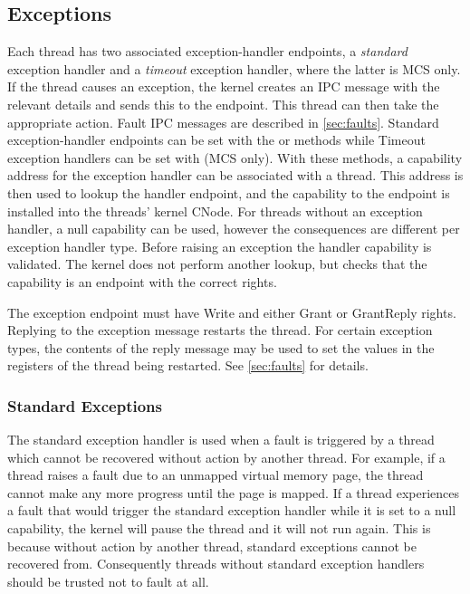 \subsection{Exceptions}
\label{sec:exceptions}

Each thread has two associated exception-handler endpoints, a \emph{standard}
exception handler and a \emph{timeout} exception handler, where the latter is MCS
only. If the thread causes
an exception, the kernel creates an IPC message with the relevant details and
sends this to the endpoint. This thread can then take the appropriate action.
Fault IPC messages are described in \autoref{sec:faults}.  Standard exception-handler
endpoints can be set with the  or
 methods while Timeout exception
handlers can be set with  (MCS only).
With these methods, a
capability address for the exception handler can be associated with a thread.
This address is then used to lookup the handler endpoint, and the capability to
the endpoint is installed into the threads' kernel CNode.  For threads without
an exception handler, a null capability can be used, however the consequences
are different per exception handler type.  Before raising an exception the
handler capability is validated. The kernel does not perform another lookup,
but checks that the capability is an endpoint with the correct rights.

The exception endpoint must have Write and either Grant or GrantReply rights.
Replying to the exception message restarts the thread. For certain exception
types, the contents of the reply message may be used to set the values in the
registers of the thread being restarted.  See \autoref{sec:faults} for details.

\subsubsection{Standard Exceptions}

The standard exception handler is used when a fault is triggered by a thread
which cannot be recovered without action by another thread.  For example, if a
thread raises a fault due to an unmapped virtual memory page, the thread cannot
make any more progress until the page is mapped.  If a thread experiences a
fault that would trigger the standard exception handler while it is set to a
null capability, the kernel will pause the thread and it will not run again.
This is because without action by another thread, standard exceptions cannot be
recovered from.  Consequently threads without standard exception handlers
should be trusted not to fault at all.

